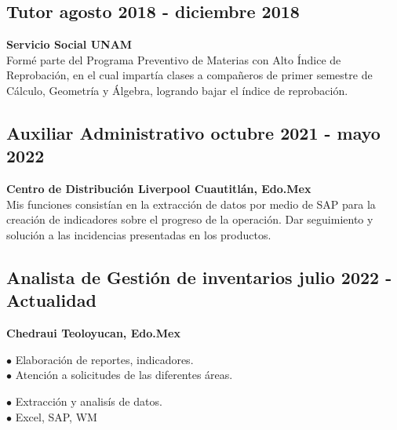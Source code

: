 \documentclass[11pt,letterpaper]{article}
\begin{document}
\subsection*{Tutor \hfill {\small\textbf{agosto 2018 - diciembre 2018}}}
{\small \textbf{Servicio Social \hfill UNAM}}\\
Formé parte del Programa Preventivo de Materias con Alto Índice de Reprobación, en el cual impartía clases
a compañeros de primer semestre de Cálculo, Geometría y Álgebra, logrando bajar el índice de
reprobación.

\subsection*{Auxiliar Administrativo \hfill {\small octubre 2021 - mayo 2022}}
{\small \textbf{Centro de Distribución Liverpool \hfill Cuautitlán, Edo.Mex}}\\
Mis funciones consistían en la extracción de datos por medio de SAP para la creación de indicadores sobre el progreso de la operación. Dar seguimiento y solución a las incidencias presentadas en los productos. 

\subsection*{Analista de Gestión de inventarios \hfill \small{julio 2022 - Actualidad }}
{\small \textbf{Chedraui \hfill Teoloyucan, Edo.Mex}}
\begin{multicols}{2}

$\bullet$ Elaboración de reportes, indicadores.\\
$\bullet$ Atención a solicitudes de las diferentes áreas.\\

\columnbreak

$\bullet$ Extracción y analisís de datos.\\
$\bullet$ Excel, SAP, WM\\
      \par  
\end{multicols}


\end{document}
